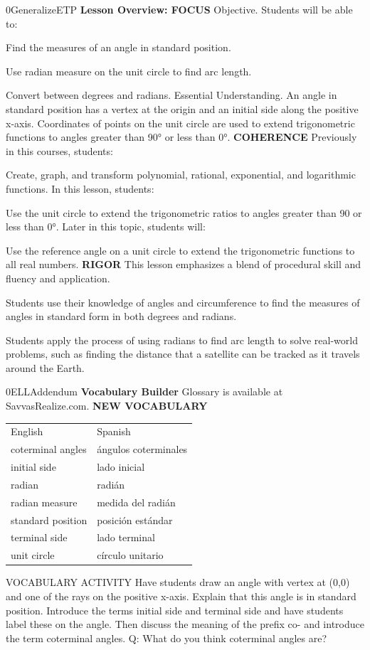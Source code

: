 \documentclass{article}
\newenvironment{te-addendum}[2]{}{}     %
\newcommand{\answer}[1]{}               %
\begin{document}
\begin{te-addendum}{0}{GeneralizeETP}
\textbf{Lesson Overview: FOCUS}
Objective. Students will be able to:
\item Find the measures of an angle in standard position.
\item Use radian measure on the unit circle to find arc length.
\item Convert between degrees and radians.
Essential Understanding. An angle in standard position has a vertex at the origin and an initial side along the positive x-axis. Coordinates of points on the unit circle are used to extend trigonometric functions to angles greater than 90° or less than 0°.
\textbf{COHERENCE}
Previously in this courses, students:
\item Create, graph, and transform polynomial, rational, exponential, and logarithmic functions.
In this lesson, students:
\item Use the unit circle to extend the trigonometric ratios to angles greater than 90 or less than 0°.
Later in this topic, students will:
\item Use the reference angle on a unit circle to extend the trigonometric functions to all real numbers.
\textbf{RIGOR}
This lesson emphasizes a blend of procedural skill and fluency and application.
\item Students use their knowledge of angles and circumference to find the measures of angles in standard form in both degrees and radians.
\item Students apply the process of using radians to find arc length to solve real-world problems, such as finding the distance that a satellite can be tracked as it travels around the Earth.
\end{te-addendum}
\begin{te-addendum}{0}{ELLAddendum}
\textbf{Vocabulary Builder}
Glossary is available at SavvasRealize.com.
\textbf{NEW VOCABULARY}
\begin{tabular}{ll}
English & Spanish \\
coterminal angles & ángulos coterminales \\
initial side & lado inicial \\
radian & radián \\
radian measure & medida del radián \\
standard position & posición estándar \\
terminal side & lado terminal \\
unit circle & círculo unitario \\
\end{tabular}
VOCABULARY ACTIVITY
Have students draw an angle with vertex at (0,0) and one of the rays on the positive x-axis. Explain that this angle is in standard position. Introduce the terms initial side and terminal side and have students label these on the angle. Then discuss the meaning of the prefix co- and introduce the term coterminal angles.
Q: What do you think coterminal angles are?
\answer{angles that share a terminal side}
\end{te-addendum}
\end{document}
